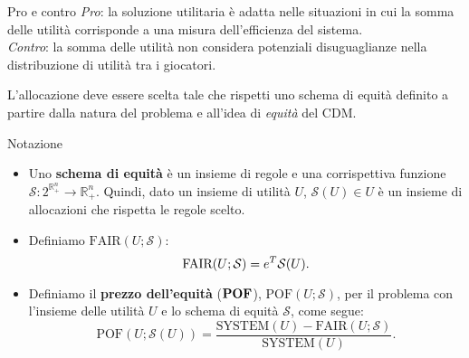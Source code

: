 \documentclass{beamer}
\begin{document}
\begin{frame}
	\begin{block}{Pro e contro}
		\textit{Pro}: la soluzione utilitaria è adatta nelle situazioni in cui la somma delle utilità corrisponde a una misura dell'efficienza del sistema.\\
		\textit{Contro}: la somma delle utilità non considera potenziali disuguaglianze nella distribuzione di utilità tra i giocatori.
	\end{block}
	L'allocazione deve essere scelta tale che rispetti uno schema di equità definito a partire dalla natura del problema e all'idea di \textit{equità} del CDM.
\end{frame}

\begin{frame}
	\begin{block}{Notazione}
		\begin{itemize}
		\item Uno \textbf{schema di equità} è un insieme di regole e una corrispettiva funzione $\mathcal{S}: 2^{\mathbb{R}^{n}_{+}} \rightarrow \mathbb{R}^{n}_{+}$. Quindi, dato un insieme di utilità $U$, $\mathcal{S}(U) \in U$ è un insieme di allocazioni che rispetta le regole scelto.\\
		\item Definiamo $\text{FAIR}(U; \mathcal{S})$:
		\vspace{-0.3cm}
		\begin{equation}
			\text{FAIR}(U; \mathcal{S}) = e^T \mathcal{S}(U).
			\vspace{-0.3cm}
		\end{equation}
		\item Definiamo il \textbf{prezzo dell'equità} ($\text{\textbf{POF}}$), $\text{POF}(U; \mathcal{S})$, per il problema con l'insieme delle utilità $U$ e lo schema di equità $\mathcal{S}$, come segue:
		\vspace{-0.3cm}
			\begin{equation}
				\text{POF}(U;\mathcal{S}(U)) = \frac{\text{SYSTEM}(U) - \text{FAIR}(U;\mathcal{S})}{\text{SYSTEM}(U)}.
			\end{equation}
		\end{itemize}
		\vspace{-0.2cm}
	\end{block}
\end{frame}
\end{document}
